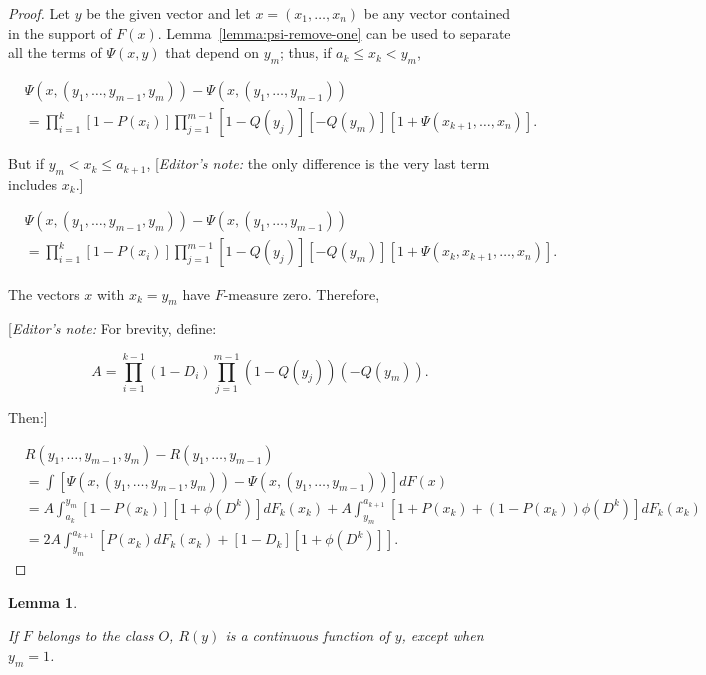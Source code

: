 \documentclass{article}
\newtheorem{lemma}{Lemma}
\begin{document}
\begin{proof}

Let $y$ be the given vector and let $x = (x_1, \dots, x_n)$ be any vector
contained in the support of $F(x)$. Lemma~\ref{lemma:psi-remove-one} can be
used to separate all the terms of $\Psi(x, y)$ that depend on $y_m$; thus, if
$a_k \leq x_k < y_m$,

\[
\begin{aligned}
&\Psi(x, (y_1, \dots, y_{m-1}, y_m)) - \Psi(x, (y_1, \dots, y_{m-1})) \\
&= \prod_{i=1}^k [1 - P(x_i)] \prod_{j=1}^{m-1} [1 - Q(y_j)][-Q(y_m)]
[1 + \Psi(x_{k+1}, \dots, x_n)].
\end{aligned}
\]

But if $y_m < x_k \leq a_{k+1}$, [\emph{Editor's note:} the only difference is
the very last term includes $x_k$.]

\[
\begin{aligned}
&\Psi(x, (y_1, \dots, y_{m-1}, y_m)) - \Psi(x, (y_1, \dots, y_{m-1})) \\
&= \prod_{i=1}^k [1 - P(x_i)] \prod_{j=1}^{m-1} [1 - Q(y_j)][-Q(y_m)]
[1 + \Psi(x_k, x_{k+1}, \dots, x_n)].
\end{aligned}
\]

The vectors $x$ with $x_k = y_m$ have $F$-measure zero. Therefore,

[\emph{Editor's note:} For brevity, define:

\[
A = \prod_{i=1}^{k-1} (1 - D_i) \prod_{j=1}^{m-1} (1 - Q(y_j))(-Q(y_m)).
\]

Then:]

\[
\begin{aligned}
& R(y_1, \dots, y_{m-1}, y_m) - R(y_1, \dots, y_{m-1}) \\
&= \int [\Psi(x, (y_1, \dots, y_{m-1}, y_m)) - \Psi(x, (y_1, \dots, y_{m-1}))] dF(x) \\
&= A \int_{a_k}^{y_m} [1 - P(x_k)][1 + \phi(D^k)] dF_k(x_k)
+ A \int_{y_m}^{a_{k+1}} [1 + P(x_k) + (1 - P(x_k)) \phi(D^k)] dF_k(x_k) \\
&= 2A \int_{y_m}^{a_{k+1}} \left [
    P(x_k) dF_k(x_k) + [1 - D_k][1 + \phi(D^k)]
\right ].
\end{aligned}
\]

\end{proof}

\begin{lemma} \label{lemma:r-is-continuous}

If $F$ belongs to the class $O$, $R(y)$ is a continuous function of $y$, except
when $y_m = 1$.

\end{lemma}
\end{document}
